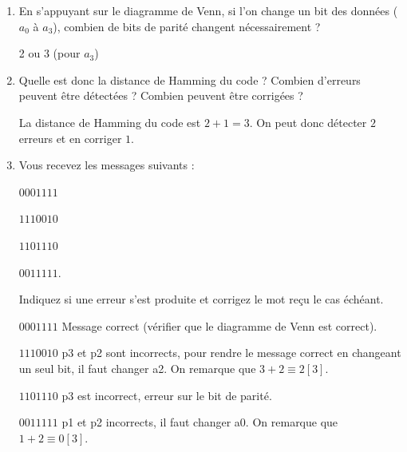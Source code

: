 \documentclass[a4paper,10pt]{exam}
\begin{document}
\begin{enumerate}
  \item En s'appuyant sur le diagramme de Venn, si l'on change un bit des données
    ($a_0$ à $a_3$), combien de bits de parité changent nécessairement ?
    \begin{solution}
      2 ou 3 (pour $a_3$)
    \end{solution}
  \item Quelle est donc la distance de Hamming du code ? Combien d'erreurs
    peuvent être détectées ? Combien peuvent être corrigées ?
    \begin{solution}
      La distance de Hamming du code est $2+1 = 3$. On peut donc détecter $2$ erreurs et en
      corriger $1$.
    \end{solution}

  \item Vous recevez les messages suivants :
  
    $0001111$
    
    $1110010$
    
    $1101110$
    
    $0011111$.
    
    Indiquez si une erreur s'est produite et corrigez le mot reçu le cas échéant.
    \begin{solution}
      $0001111$ Message correct (vérifier que le diagramme de Venn est correct).

      $1110010$ p3 et p2 sont incorrects, pour rendre le message correct en
      changeant un seul bit, il faut changer a2. On remarque que $3+2 \equiv 2
      [3]$.

      $1101110$ p3 est incorrect, erreur sur le bit de parité.

      $0011111$ p1 et p2 incorrects, il faut changer a0. On remarque que $1+2
      \equiv 0 [3]$.
    \end{solution}



\end{enumerate}
\end{document}

